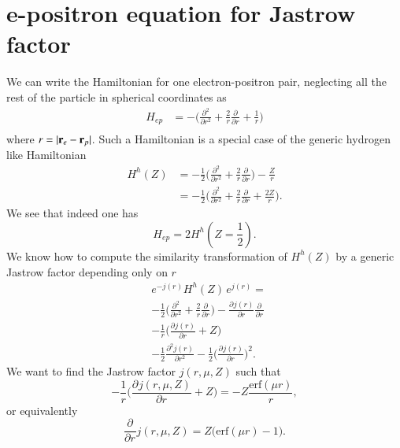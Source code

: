 \documentclass[aip,jcp,reprint,noshowkeys,superscriptaddress]{revtex4-1}
\newcommand{\deriv}[3]{\frac{\partial^{#3} #1}{\partial {#2}^{#3}}}
\newcommand{\br}[0]{{\bf {r}}}
\begin{document}
\section{e-positron equation for Jastrow factor}
We can write the Hamiltonian for one electron-positron pair, neglecting all the rest of the particle in spherical coordinates as 
\begin{equation}
 \begin{aligned}
  H_{ep} & = -\big( \deriv{}{r}{2} + \frac{2}{r} \deriv{}{r}{} + \frac{1}{r} \big) \\
 \end{aligned}
\end{equation}
where $r= |\br_{e}-\br_{p}|$. 
Such a Hamiltonian is a special case of the generic hydrogen like Hamiltonian 
\begin{equation}
 \begin{aligned}
 H^h(Z) & = -\frac{1}{2} \big( \deriv{}{r}{2} + \frac{2}{r} \deriv{}{r}{}\big) - \frac{Z}{r} \\
     & = -\frac{1}{2} \big( \deriv{}{r}{2} + \frac{2}{r} \deriv{}{r}{} + \frac{2Z}{r}\big).  
 \end{aligned}
\end{equation}
We see that indeed one has 
\begin{equation}
 H_{ep} = 2 H^h(Z=\frac{1}{2}).
\end{equation}
We know how to compute the similarity transformation of $H^h(Z)$ by a generic Jastrow factor depending only on $r$
\begin{equation}
 \begin{aligned}
 \label{eq:one_e_0}
 & e^{-j(r)}H^h(Z)\,e^{j(r)} = \\
 & -\frac{1}{2}\big( \deriv{}{r}{2} + \frac{2}{r} \deriv{}{r}{} \big) -\deriv{j(r)}{r}{}\deriv{}{r}{}\\
 &-\frac{1}{r}\bigg(\deriv{j(r)}{r}{} + Z \bigg) \\ 
 & - \frac{1}{2}\deriv{j(r)}{r}{2} -  \frac{1}{2}\bigg(\deriv{j(r)}{r}{} \bigg)^2.
 \end{aligned}
\end{equation}
We want to find the Jastrow factor $j(r,\mu,Z)$ such that
\begin{equation}
 \label{eq:one_e_01}
 -\frac{1}{r}\bigg(\deriv{j(r,\mu,Z)}{r}{} + Z \bigg) = -Z\frac{\text{erf}(\mu r)}{r},
\end{equation}
or equivalently
\begin{equation}
 \label{eq:one_e_1}
 \deriv{}{r}{}j(r,\mu,Z) = Z\bigg( \text{erf}(\mu r) - 1\bigg).
\end{equation}                                                      
\end{document}
